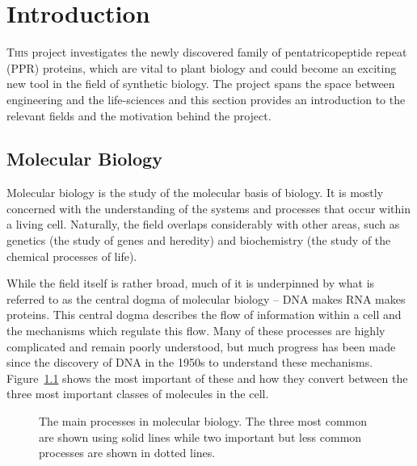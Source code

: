 
\chapter{Introduction}
\label{chap:Introduction} 

\lettrine{T}{his} project investigates the newly discovered family of 
pentatricopeptide repeat (PPR) proteins, which are vital to plant biology and 
could become an exciting new tool in the field of synthetic biology.
The project spans the space between engineering and the life-sciences and this
section provides an introduction to the relevant fields and the motivation
behind the project.

\section{Molecular Biology}
\label{sec:MolecularBiology}

Molecular biology is the study of the molecular basis of biology.
It is mostly concerned with the understanding of the systems and processes
that occur within a living cell.
Naturally, the field overlaps considerably with other areas, 
such as genetics (the study of genes and heredity) and biochemistry (the study
of the chemical processes of life).

While the field itself is rather broad, much of it is underpinned by what is
referred to as the central dogma of molecular biology -- 
DNA makes RNA makes proteins.
This central dogma describes the flow of information within a cell and the
mechanisms which regulate this flow.
Many of these processes are highly complicated and remain poorly
understood, but much progress has been made since the discovery of DNA in the
1950s to understand these mechanisms.
Figure~\ref{fig:processes} shows the most important of these and how
they convert between the three most important classes of molecules in the cell.

\begin{figure}
  \centering
  \caption{The main processes in molecular biology. The three most common are
    shown using solid lines while two important but less common processes are
    shown in dotted lines.
    \label{fig:processes}}
\end{figure}

